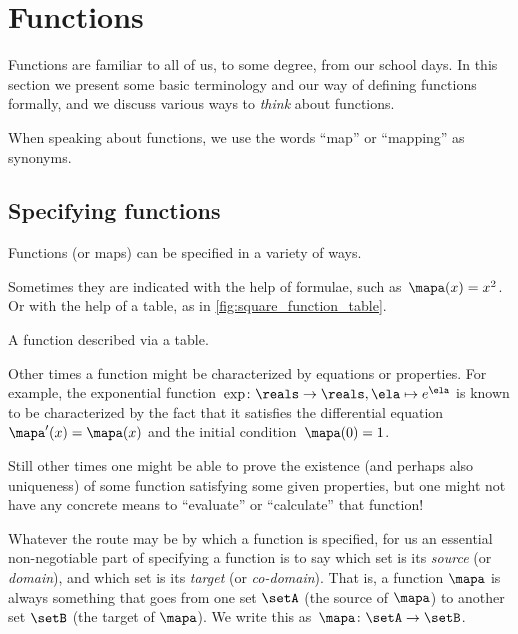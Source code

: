 
\section{Functions}
\label{sec:functions}

Functions are familiar to all of us, to some degree, from our school days.
In this section we present some basic terminology and our way of defining functions formally, and we discuss various ways to \emph{think} about functions.

When speaking about functions, we use the words ``map'' or ``mapping'' as synonyms.

\subsection{Specifying functions}
\label{sec:domain-codomain}

Functions (or maps) can be specified in a variety of ways.

Sometimes they are indicated with the help of formulae, such as~$\mapa(x)=x^2$.
Or with the help of a table, as in \cref{fig:square_function_table}.

\begin{marginfigure}
    \centering
    \caption{A function described via a table.}
    \label{fig:square_function_table}
\end{marginfigure}

Other times a function might be characterized by equations or properties.
For example, the exponential function~$\exp \colon \reals \to \reals, \ela \mapsto e^\ela$ is known to be characterized by the fact that it satisfies the differential equation~$\mapa'(x) = \mapa(x)$ and the initial condition~$\mapa(0) =1$.

Still other times one might be able to prove the existence (and perhaps also uniqueness) of some function satisfying some given properties, but one might not have any concrete means to ``evaluate'' or ``calculate'' that function!

Whatever the route may be by which a function is specified, for us an essential non-negotiable part of specifying a function is to say which set is its \emph{source} (or \emph{domain}), and which set is its \emph{target} (or \emph{co-domain}).
That is, a function $\mapa$ is always something that goes from one set $\setA$ (the source of $\mapa$) to another set $\setB$ (the target of $\mapa$).
We write this as~$\mapa\colon \setA \to \setB$.

